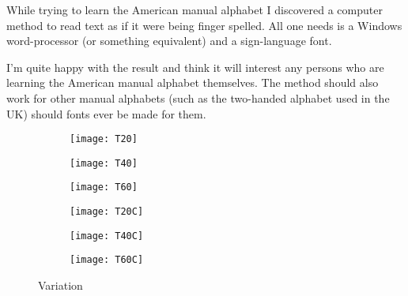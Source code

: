 \documentclass[twocolumn,showpacs,amsmath,amssymb,aps,prl,nobalancelastpage]{article}
\begin{document}
    While trying to learn the American manual alphabet I discovered a   computer method to read text as if it were being finger spelled. All one needs is a Windows word-processor (or something equivalent) and a sign-language font.

I'm quite happy with the result and think it will interest any persons who are learning the American manual alphabet themselves. The method should also work for other manual alphabets (such as the two-handed alphabet used in the UK) should fonts ever be made for them.


\begin{figure*}
    \centering
    \begin{subfigure}
        \centering
        \texttt{[image: T20]}
    \end{subfigure}
    \begin{subfigure}
        \centering
        \texttt{[image: T40]}
    \end{subfigure}
    \begin{subfigure}
        \centering
        \texttt{[image: T60]}
    \end{subfigure}

    \medskip
    \begin{subfigure}
        \centering
        \texttt{[image: T20C]}
    \end{subfigure}
    \begin{subfigure}
        \centering
        \texttt{[image: T40C]}
    \end{subfigure}
    \begin{subfigure}
        \centering
        \texttt{[image: T60C]}
    \end{subfigure}
    \caption{Variation}\label{width_3}
\end{figure*}
\end{document}
